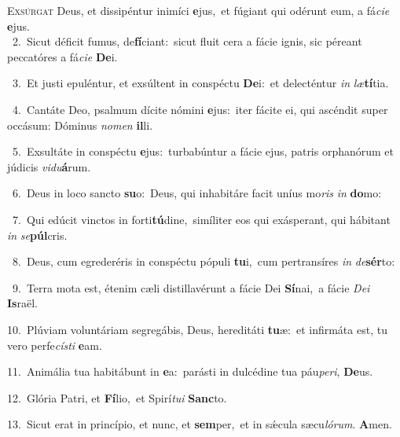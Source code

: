 \lettrine{\initial\textcolor{\initialcolor}{E}}{xsúrgat} Deus, et dissipéntur inimíci \textbf{e}\-jus,~\star et fúgiant qui odérunt eum, a fá\-\textit{ci}\-\textit{e} \textbf{e}\-jus.\\
{\numbfont\textcolor{\numbcolor}{~2.}}~Sicut déficit fumus, de\-\textbf{fí}\-ciant:~\star sicut fluit cera a fácie ignis, sic péreant peccatóres a fá\-\textit{ci}\-\textit{e} \textbf{De}\-i.\par
{\numbfont\textcolor{\numbcolor}{~3.}}~Et justi epuléntur, et exsúltent in conspéctu \textbf{De}\-i:~\star et delecténtur \textit{in} \textit{læ}\-\textbf{tí}tia.\par
{\numbfont\textcolor{\numbcolor}{~4.}}~Cantáte Deo, psalmum dícite nómini \textbf{e}\-jus:~\star iter fácite ei, qui ascéndit super occásum: Dóminus \textit{no}\-\textit{men} \textbf{il}\-li.\par
{\numbfont\textcolor{\numbcolor}{~5.}}~Exsultáte in conspéctu \textbf{e}\-jus:~\star turbabúntur a fácie ejus, patris orphanórum et júdicis \textit{vi}\-\textit{du}\textbf{á}rum.\par
{\numbfont\textcolor{\numbcolor}{~6.}}~Deus in loco sancto \textbf{su}\-o:~\star Deus, qui inhabitáre facit uníus mo\textit{ris} \textit{in} \textbf{do}\-mo:\par
{\numbfont\textcolor{\numbcolor}{~7.}}~Qui edúcit vinctos in forti\-\textbf{tú}\-dine,~\star simíliter eos qui exásperant, qui hábitant \textit{in} \textit{se}\-\textbf{púl}cris.\par
{\numbfont\textcolor{\numbcolor}{~8.}}~Deus, cum egrederéris in conspéctu pópuli \textbf{tu}\-i,~\star cum pertransíres \textit{in} \textit{de}\-\textbf{sér}to:\par
{\numbfont\textcolor{\numbcolor}{~9.}}~Terra mota est, étenim cæli distillavérunt a fácie Dei \textbf{Sí}\-nai,~\star a fácie \textit{De}\-\textit{i} \textbf{Is}\-raël.\par
{\numbfont\textcolor{\numbcolor}{10.}}~Plúviam voluntáriam segregábis, Deus, hereditáti \textbf{tu}\-æ:~\star et infirmáta est, tu vero perfe\-\textit{cís}\-\textit{ti} \textbf{e}\-am.\par
{\numbfont\textcolor{\numbcolor}{11.}}~Animália tua habitábunt in \textbf{e}\-a:~\star parásti in dulcédine tua páu\-\textit{pe}\-\textit{ri}, \textbf{De}\-us.\par
{\numbfont\textcolor{\numbcolor}{12.}}~Glória Patri, et \textbf{Fí}\-lio,~\star et Spirí\-\textit{tu}\-\textit{i} \textbf{Sanc}\-to.\par
{\numbfont\textcolor{\numbcolor}{13.}}~Sicut erat in princípio, et nunc, et \textbf{sem}\-per,~\star et in sǽcula sæcu\-\textit{ló}\-\textit{rum}. \textbf{A}\-men.\par
